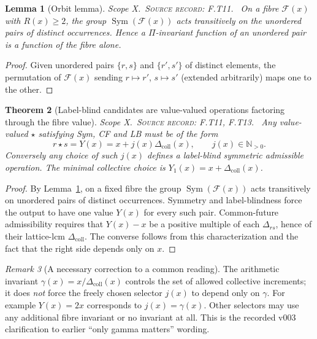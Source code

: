 \documentclass[11pt,oneside,openany]{book}
\newtheorem{theorem}{Theorem}[chapter]
\newtheorem{lemma}[theorem]{Lemma}
\theoremstyle{definition}
\theoremstyle{remark}
\newtheorem{remark}[theorem]{Remark}
\newcommand{\N}{\mathbb{N}}
\newcommand{\Fx}{\mathcal{F}}
\newcommand{\scope}[1]{\textsf{\small Scope #1.}\ }
\newcommand{\record}[1]{\textup{\textsc{Source record: #1.}}\ }
\newcommand{\Del}{\Delta}
\begin{document}
\begin{lemma}[Orbit lemma]\label{lem:orbit}
\scope{X}\record{F.T11} On a fibre \(\Fx(x)\) with \(R(x)\ge2\), the group \(\operatorname{Sym}(\Fx(x))\) acts transitively on the unordered pairs of distinct occurrences. Hence a \(\Pi\)-invariant function of an unordered pair is a function of the fibre alone.
\end{lemma}
\begin{proof}
Given unordered pairs \(\{r,s\}\) and \(\{r',s'\}\) of distinct elements, the permutation of \(\Fx(x)\) sending \(r\mapsto r'\), \(s\mapsto s'\) (extended arbitrarily) maps one to the other.
\end{proof}

\begin{theorem}[Label-blind candidates are value-valued operations factoring through the fibre value]\label{thm:blind}
\scope{X}\record{F.T11, F.T13} Any value-valued \(\star\) satisfying Sym, CF and LB must be of the form
\begin{equation}\label{eq:blind}
 r\star s=Y(x)=x+j(x)\Del_{\mathrm{coll}}(x),\qquad j(x)\in\N_{>0}.
\end{equation}
Conversely any choice of such \(j(x)\) defines a label-blind symmetric admissible operation. The minimal collective choice is \(Y_1(x)=x+\Del_{\mathrm{coll}}(x)\).
\end{theorem}
\begin{proof}
By Lemma~\ref{lem:orbit}, on a fixed fibre the group \(\operatorname{Sym}(\Fx(x))\) acts transitively on unordered pairs of distinct occurrences. Symmetry and label-blindness force the output to have one value \(Y(x)\) for every such pair. Common-future admissibility requires that \(Y(x)-x\) be a positive multiple of each \(\Del_{rs}\), hence of their lattice-lcm \(\Del_{\mathrm{coll}}\). The converse follows from this characterization and the fact that the right side depends only on \(x\).
\end{proof}

\begin{remark}[A necessary correction to a common reading]\label{rem:gamma}
The arithmetic invariant \(\gamma(x)=x/\Del_{\mathrm{coll}}(x)\) controls the set of allowed collective increments; it does \emph{not} force the freely chosen selector \(j(x)\) to depend only on \(\gamma\). For example \(Y(x)=2x\) corresponds to \(j(x)=\gamma(x)\). Other selectors may use any additional fibre invariant or no invariant at all. This is the recorded v003 clarification to earlier ``only gamma matters'' wording.
\end{remark}
\end{document}
